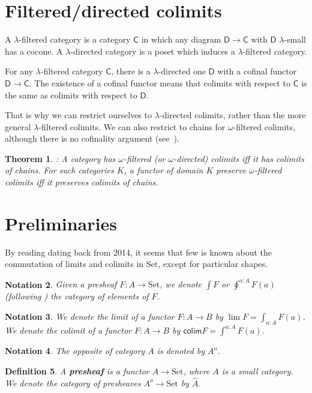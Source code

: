 \documentclass{article}
\newcommand{\CC}{\mathsf{C}}
\newcommand{\DD}{\mathsf{D}}
\newcommand{\Set}{\text{Set}}
\newcommand{\colim}{\mathsf{colim}}
\newtheorem{theorem}{Theorem}[section]
\newtheorem{definition}[theorem]{Definition}
\newtheorem{notation}[theorem]{Notation}
\begin{document}
\section{Filtered/directed colimits}
A $\lambda$-filtered category is a category $\CC$ in which any diagram
$\DD\to \CC$ with $\DD$ $\lambda$-small has a cocone. A $\lambda$-directed
category is a poset which induces a $\lambda$-filtered category.

For any $\lambda$-filtered category $\CC$, there is a $\lambda$-directed one
$\DD$ with a cofinal functor $\DD\to\CC$. The existence of a cofinal functor
means that colimits with respect to $\CC$ is the same as colimits with respect
to $\DD$.

That is why we can restrict ourselves to $\lambda$-directed colimits, rather
than the more general $\lambda$-filtered colimits. We can also restrict to
chains for $\omega$-filtered colimits, although there is no cofinality argument
(see~\cite[Example 1.8]{adamek_rosicky}).
\begin{theorem}
 \cite[Corollary 1.7]{adamek_rosicky}:
 A category has $\omega$-filtered (or $\omega$-directed) colimits iff it has
 colimits of chains. For such categories $K$, a functor of domain $K$ preserve
 $\omega$-filtered colimits iff it preserves colimits of chains.
\end{theorem}


\section{Preliminaries}
By reading \cite{commutationlim} dating back from 2014, it seems that few is
known about the commutation of limits and colimits in $\Set$, except for
particular shapes.

\begin{notation}
  Given a presheaf $F : A \rightarrow \Set$,
  we denote $\int F$  or $\oint^{a:A} F(a)$
  (following \cite{coend})
  the category of elements of $F$.
\end{notation}
\begin{notation}
  We denote the limit of a functor $F:A\rightarrow B$ by $\lim F = \int_{a:A}F(a)$.
  We denote the colimit of a functor $F:A\rightarrow B$ by $\colim F = \int^{a:A}F(a)$.
\end{notation}
\begin{notation}
  The opposite of category $A$ is denoted by $A^o$.
\end{notation}
\begin{definition}
  A \textbf{presheaf} is a functor $A \rightarrow \Set$, where $A$ is a small
  category.
  We denote the category of presheaves $A^o \rightarrow \Set $ by $\hat{A}$.
\end{definition}
\end{document}
